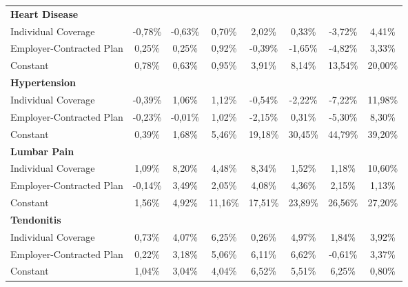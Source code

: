 \documentclass{article}
\begin{document}
\begin{table*}
{\begin{tabular}{l*{7}{c}}
\midrule
\textbf{Heart Disease} & & & & & & & \\

Individual Coverage      &  -0,78\%         &  -0,63\%\sym{*}  &   0,70\%         &   2,02\%         &   0,33\%         &  -3,72\%         &   4,41\%         \\
Employer-Contracted Plan &   0,25\%         &   0,25\%         &   0,92\%         &  -0,39\%         &  -1,65\%         &  -4,82\%         &   3,33\%         \\
Constant                 &   0,78\%         &   0,63\%\sym{*}  &   0,95\%         &   3,91\%\sym{***}&   8,14\%\sym{***}&  13,54\%\sym{***}&  20,00\%\sym{***}\\

\midrule
\textbf{Hypertension} & & & & & & & \\

Individual Coverage      &  -0,39\%         &   1,06\%         &   1,12\%         &  -0,54\%         &  -2,22\%         &  -7,22\%         &  11,98\%         \\
Employer-Contracted Plan &  -0,23\%         &  -0,01\%         &   1,02\%         &  -2,15\%         &   0,31\%         &  -5,30\%         &   8,30\%         \\
Constant                 &   0,39\%         &   1,68\%\sym{***}&   5,46\%\sym{***}&  19,18\%\sym{***}&  30,45\%\sym{***}&  44,79\%\sym{***}&  39,20\%\sym{***}\\

\midrule
\textbf{Lumbar Pain} & & & & & & & \\

Individual Coverage      &   1,09\%         &   8,20\%\sym{**} &   4,48\%         &  \cellcolor[gray]{0.9} 8,34\%\sym{*}  &   1,52\%         &   1,18\%         &  10,60\%         \\
Employer-Contracted Plan &  -0,14\%         & \cellcolor[gray]{0.9}  3,49\%\sym{**} &   2,05\%         &   4,08\%         &   4,36\%         &   2,15\%         &   1,13\%         \\
Constant                 &   1,56\%\sym{**} &   4,92\%\sym{***}&  11,16\%\sym{***}&  17,51\%\sym{***}&  23,89\%\sym{***}&  26,56\%\sym{***}&  27,20\%\sym{***}\\

\midrule
\textbf{Tendonitis} & & & & & & & \\

Individual Coverage      &   0,73\%         &  \cellcolor[gray]{0.9} 4,07\%\sym{*}  & \cellcolor[gray]{0.9}  6,25\%\sym{**} &   0,26\%         &  \cellcolor[gray]{0.9} 4,97\%\sym{*}  &   1,84\%         &   3,92\%         \\
Employer-Contracted Plan &   0,22\%         & \cellcolor[gray]{0.9}  3,18\%\sym{***}&  \cellcolor[gray]{0.9} 5,06\%\sym{***}& \cellcolor[gray]{0.9}  6,11\%\sym{***}&  \cellcolor[gray]{0.9} 6,62\%\sym{***}&  -0,61\%         &   3,37\%         \\
Constant                 &   1,04\%\sym{*}  &   3,04\%\sym{***}&   4,04\%\sym{***}&   6,52\%\sym{***}&   5,51\%\sym{***}&   6,25\%\sym{***}&   0,80\%         \\


\end{tabular}}
\end{table*}
\end{document}
